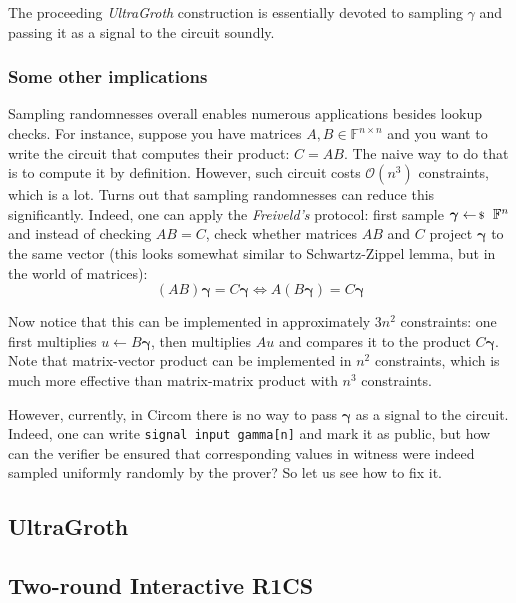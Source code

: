 \documentclass[../../book]{subfiles}
\begin{document}
The proceeding \textit{UltraGroth} construction is essentially devoted to
sampling $\gamma$ and passing it as a signal to the circuit soundly.

\subsubsection{Some other implications}

Sampling randomnesses overall enables numerous applications besides lookup
checks. For instance, suppose you have matrices $A,B \in \mathbb{F}^{n \times
n}$ and you want to write the circuit that computes their product: $C=AB$. The
naive way to do that is to compute it by definition. However, such circuit costs
$\mathcal{O}(n^3)$ constraints, which is a lot. Turns out that sampling
randomnesses can reduce this significantly. Indeed, one can apply the
\textit{Freiveld's} protocol: first sample $\boldsymbol{\gamma} \leftarrowS \mathbb{F}^n$ and
instead of checking $AB=C$, check whether matrices $AB$ and $C$ project $\boldsymbol{\gamma}$
to the same vector (this looks somewhat similar to Schwartz-Zippel lemma, but in
the world of matrices):
\[
(AB)\boldsymbol{\gamma} = C\boldsymbol{\gamma} \iff A(B\boldsymbol{\gamma}) = C\boldsymbol{\gamma}
\]

Now notice that this can be implemented in approximately $3n^2$ constraints: one
first multiplies $u \gets B\boldsymbol{\gamma}$, then multiplies $Au$ and compares it to the
product $C\boldsymbol{\gamma}$. Note that matrix-vector product can be implemented in $n^2$
constraints, which is much more effective than matrix-matrix product with $n^3$
constraints.

However, currently, in Circom there is no way to pass $\boldsymbol{\gamma}$ as a signal to
the circuit. Indeed, one can write \texttt{signal input gamma[n]} and mark it as
public, but how can the verifier be ensured that corresponding values in witness
were indeed sampled uniformly randomly by the prover? So let us see how to fix
it.

\subsection{UltraGroth}

\subsection{Two-round Interactive R1CS}
\end{document}
